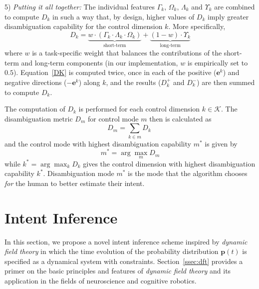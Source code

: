 \documentclass[journal]{IEEEtran}
\newcommand{\argmax}{\arg\!\max}
\begin{document}
5) \textit{Putting it all together:} 
The individual features $\Gamma_k$, $\Omega_k$, $\Lambda_k$ and $\Upsilon_k$ are combined to compute $D_{k}$ in such a way that, by design, higher values of $D_k$ imply greater disambiguation capability for the control dimension $k$. More specifically, 
\begin{equation}\label{DK}
D_{k} = \underbrace{w\cdot(\Gamma_k\cdot \Lambda_k\cdot\Omega_k)}_{\text{short-term}} + \underbrace{(1 - w)\cdot \Upsilon_k}_{\text{long-term}}
\end{equation}
where $w$ is a task-specific weight that balances the contributions of the short-term and long-term components (in our implementation, $w$ is empirically set to $0.5$). Equation~\ref{DK} is computed twice, once in each of the positive ($\boldsymbol{e}^k$) and negative directions ($-\boldsymbol{e}^k$) along $k$, and the results ($D_k^+$ and $D_k^-$) are then summed to compute $D_k$. 

The computation of $D_k$ is performed for each control dimension $k \in \mathcal{K}$. The disambiguation metric $D_m$ for control mode $m$ then is calculated as 
\begin{equation*}\label{EQ2}
D_m = \sum_{k \in m} D_{k} \;
\end{equation*}
and the control mode with highest disambiguation capability $m^*$ is given by
\begin{equation*}
m^* = \argmax_m  D_{m}
\end{equation*}
while $k^* = \argmax_k D_k$ gives the control dimension with highest disambiguation capability $k^{*}$.
Disambiguation mode $m^{*}$ is the mode that the algorithm chooses \textit{for} the human to better estimate their intent. 
\section{Intent Inference}\label{sec:inference}

In this section, we propose a novel intent inference scheme inspired by \textit{dynamic field theory} in which the time evolution of the probability distribution $\boldsymbol{p}(t)$ is specified as a dynamical system with constraints. Section~\ref{ssec:dft} provides a primer on the basic principles and features of \textit{dynamic field theory} and its application in the fields of neuroscience and cognitive robotics. 
\end{document}
